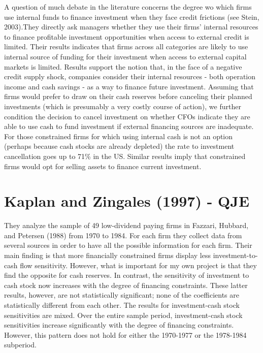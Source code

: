 \documentclass{article}
\begin{document}
{A question of much debate in the literature concerns the degree wo which firms use internal funds to finance investment when they face credit frictions (see Stein, 2003).They directly ask managers whether they use their firms' internal resources to finance profitable investment opportunities when access to external credit is limited. Their results indicates that firms across all categories are likely to use internal source of funding for their investment when access to external capital markets is limited. Results support the notion that, in the face of a negative credit supply shock, companies consider their internal resources - both operation income and cash savings - as a way to finance future investment. Assuming that firms would prefer to draw on their cash reserves before canceling their planned investments (which is presumably a very costly course of action), we further condition the decision to cancel investment on whether CFOs indicate they are able to use cash to fund investment if external financing sources are inadequate. For those constrained firms for which using internal cash is not an option (perhaps because cash stocks are already depleted) the rate to investment cancellation goes up to 71\% in the US. Similar results imply that constrained firms would opt for selling assets to finance current investment. 

\section{Kaplan and Zingales (1997) - QJE}

They analyze the sample of 49 low-dividend paying firms in Fazzari, Hubbard, and Petersen (1988) from 1970 to 1984. For each firm they collect data from several sources in order to have all the possible information for each firm. Their main finding is that more financially constrained firms display less investment-to-cash flow sensitivity. However, what is important for my own project is that they find the opposite for cash reserves. In contrast, the sensitivity of investment to cash stock now increases with the degree of financing constraints. These latter results, however, are not statistically significant; none of the coefficients are statistically different from each other. The results for investment-cash stock sensitivities are mixed. Over the entire sample period, investment-cash stock sensitivities increase significantly with the degree of financing constraints. However, this pattern does not hold for either the 1970-1977 or the 1978-1984 subperiod. 

}
\end{document}
